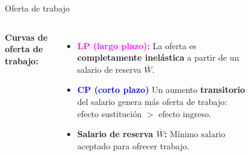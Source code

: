 \documentclass{beamer}
\begin{document}
\begin{frame}{Oferta de trabajo}
\begin{columns}

\textbf{Curvas de oferta de trabajo:}
    \small
    \begin{itemize}
        \item \textbf{\textcolor{magenta}{LP (largo plazo):}} La oferta es \textbf{completamente inelástica} a partir de un salario de reserva \(\bar{W}\).
        
        \item \textbf{\textcolor{blue}{CP (corto plazo)}}  
        Un aumento \textbf{transitorio} del salario genera más oferta de trabajo:  
        efecto sustitución \(>\) efecto ingreso.

        \item \textbf{Salario de reserva \(\bar{W}\):}  
        Mínimo salario aceptado para ofrecer trabajo.
    \end{itemize}
        \begin{figure}[H]
        \begin{center}
        \end{center}
        \end{figure}
    \end{columns}
\end{frame}
\end{document}
